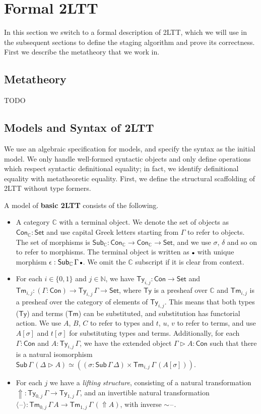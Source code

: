 \documentclass[acmsmall]{acmart}
\newcommand{\msf}[1]{\mathsf{#1}}
\newcommand{\mbb}[1]{\mathbb{#1}}
\newcommand{\ext}{\triangleright}
\newcommand{\Lift}{{\Uparrow}}
\newcommand{\spl}{{\sim}}
\newcommand{\qut}[1]{\langle #1\rangle}
\newcommand{\mbbc}{\mbb{C}}
\newcommand{\Con}{\msf{Con}}
\newcommand{\Sub}{\msf{Sub}}
\newcommand{\Ty}{\msf{Ty}}
\newcommand{\Tm}{\msf{Tm}}
\newcommand{\emptycon}{\scaleobj{.75}\bullet}
\newcommand{\Set}{\mathsf{Set}}
\newcommand{\blank}{{\mathord{\hspace{1pt}\text{--}\hspace{1pt}}}}
\theoremstyle{remark}
\begin{document}
\section{Formal 2LTT}

In this section we switch to a formal description of 2LTT, which we will use in
the subsequent sections to define the staging algorithm and prove its
correctness. First we describe the metatheory that we work in.

\subsection{Metatheory}
TODO

\subsection{Models and Syntax of 2LTT}
We use an algebraic specification for models, and specify the syntax as the
initial model. We only handle well-formed syntactic objects and only define
operations which respect syntactic definitional equality; in fact, we identify
definitional equality with metatheoretic equality. First, we define the
structural scaffolding of 2LTT without type formers.

\begin{definition} A model of \textbf{basic 2LTT} consists of the following.
\begin{itemize}
\item
  A category $\mbbc$ with a terminal object. We denote the set of objects as
  $\Con_{\mbbc} : \Set$ and use capital Greek letters starting from $\Gamma$ to
  refer to objects. The set of morphisms is $\Sub_{\mbbc} : \Con_{\mbbc} \to
  \Con_{\mbbc} \to \Set$, and we use $\sigma$, $\delta$ and so on to refer to
  morphisms. The terminal object is written as $\emptycon$ with unique morphism
  $\epsilon : \Sub_\mbbc\,\Gamma\,\emptycon$. We omit the $\mbbc$ subscript if
  it is clear from context.
\item
  For each $i \in \{0,1\}$ and $j \in \mbb{N}$, we have $\Ty_{i,j} : \Con
  \to \Set$ and $\Tm_{i,j} : (\Gamma : \Con) \to \Ty_{i,j}\,\Gamma \to \Set$,
  where $\Ty$ is a presheaf over $\mbbc$ and $\Tm_{i,j}$ is a presheaf over the
  category of elements of $\Ty_{i,j}$. This means that both types ($\Ty$) and
  terms ($\Tm$) can be substituted, and substitution has functorial action. We
  use $A$, $B$, $C$ to refer to types and $t$, $u$, $v$ to refer to terms, and
  use $A[\sigma]$ and $t[\sigma]$ for substituting types and
  terms. Additionally, for each $\Gamma : \Con$ and $A : \Ty_{i,j}\,\Gamma$, we
  have the extended object $\Gamma \ext A : \Con$ such that there is a natural
  isomorphism $\Sub\,\Gamma\,(\Delta\ext A) \simeq ((\sigma :
  \Sub\,\Gamma\,\Delta) \times \Tm_{i,j}\,\Gamma\,(A[\sigma]))$.
\item
  For each $j$ we have a \emph{lifting structure}, consisting of a natural
  transformation $\Lift : \Ty_{0,j}\,\Gamma \to \Ty_{1,j}\,\Gamma$, and an
  invertible natural transformation $\qut{\blank} : \Tm_{0,j}\,\Gamma\,A \to
  \Tm_{1,j}\,\Gamma\,(\Lift A)$, with inverse $\spl\blank$.
\end{itemize}
\end{definition}
\end{document}
